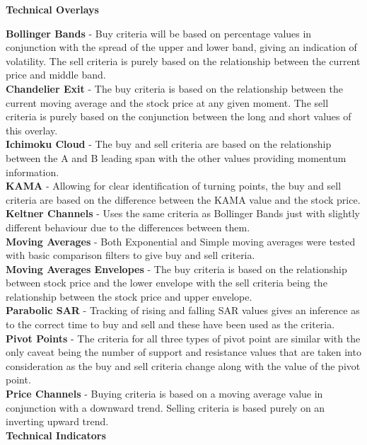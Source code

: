 \documentclass[12pt,a4paper]{article}
\begin{document}
\noindent
\textbf{Technical Overlays}

\noindent
\textbf{Bollinger Bands} - Buy criteria will be based on percentage values in conjunction with the spread of the upper and lower band, giving an indication of volatility. The sell criteria is purely based on the relationship between the current price and middle band.\\
\textbf{Chandelier Exit} - The buy criteria is based on the relationship between the current moving average and the stock price at any given moment. The sell criteria is purely based on the conjunction between the long and short values of this overlay.\\
\textbf{Ichimoku Cloud} - The buy and sell criteria are based on the relationship between the A and B leading span with the other values providing momentum information.\\
\textbf{KAMA} - Allowing for clear identification of turning points, the buy and sell criteria are based on the difference between the KAMA value and the stock price.\\
\textbf{Keltner Channels} - Uses the same criteria as Bollinger Bands just with slightly different behaviour due to the differences between them.\\
\textbf{Moving Averages} - Both Exponential and Simple moving averages were tested with basic comparison filters to give buy and sell criteria.\\
\textbf{Moving Averages Envelopes} - The buy criteria is based on the relationship between stock price and the lower envelope with the sell criteria being the relationship between the stock price and upper envelope.\\
\textbf{Parabolic SAR} - Tracking of rising and falling SAR values gives an inference as to the correct time to buy and sell and these have been used as the criteria.\\
\textbf{Pivot Points} - The criteria for all three types of pivot point are similar with the only caveat being the number of support and resistance values that are taken into consideration as the buy and sell criteria change along with the value of the pivot point.\\
\textbf{Price Channels} - Buying criteria is based on a moving average value in conjunction with a downward trend. Selling criteria is based purely on an inverting upward trend.\\

\noindent
\textbf{Technical Indicators}
\end{document}
